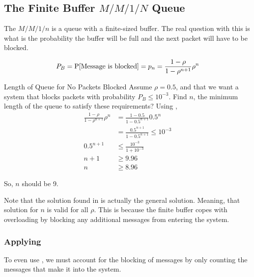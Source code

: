 \subsection{\texorpdfstring{The Finite Buffer $M/M/1/N$ Queue}{Finite Buffer Queue}}\label{subsec:MM1n_Queue}
The $M/M/1/n$ is a queue with a finite-sized buffer.
The real question with this is what is the probability the buffer will be full and the next packet will have to be blocked.

\begin{equation}\label{eq:Prob_Packet_Blocked}
  P_{B} = \operatorname{\operatorname{P}}[\text{Message is blocked}] = p_{n} = \frac{1-\rho}{1-\rho^{n+1}} \rho^{n}
\end{equation}

\begin{example}[Lecture 4]{Length of Queue for No Packets Blocked}
  Assume $\rho = 0.5$, and that we want a system that blocks packets with probability $P_{B} \leq 10^{-3}$.
  Find $n$, the minimum length of the queue to satisfy these requirements?
  \tcblower{}
  Using ,
  \begin{align*}
    \frac{1-\rho}{1-\rho^{n+1}} \rho^{n} &= \frac{1-0.5}{1-0.5^{n+1}} 0.5^{n} \\
                                         &= \frac{0.5^{n+1}}{1-0.5^{n+1}} \leq 10^{-3} \\
    0.5^{n+1} &\leq \frac{10^{-3}}{1 + 10^{-3}} \\
    n + 1 &\geq 9.96 \\
    n &\geq 8.96
  \end{align*}

  So, $n$ should be 9.
\end{example}

\begin{remark*}
  Note that the solution found in  is actually the general solution.
  Meaning, that solution for $n$ is valid for all $\rho$.
  This is because the finite buffer copes with overloading by blocking any additional messages from entering the system.
\end{remark*}

\subsubsection{Applying }\label{subsubsec:Applying_Littles_Law-MM1n}
To even use , we must account for the blocking of messages by only counting the messages that make it into the system.

